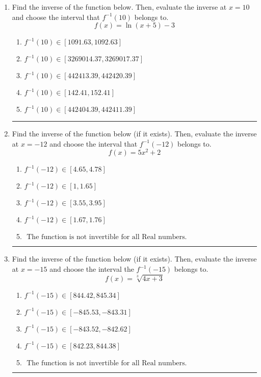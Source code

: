 \documentclass[14pt]{extbook}
\newcommand{\litem}[1]{\item#1\hspace*{-1cm}\rule{\textwidth}{0.4pt}}
\begin{document}
\begin{enumerate}
{\begin{enumerate}[label=\Alph*.]
\end{enumerate} }
\litem{
Find the inverse of the function below. Then, evaluate the inverse at $x = 10$ and choose the interval that $f^{-1}(10)$ belongs to.\[ f(x) = \ln{(x+5)}-3 \]\begin{enumerate}[label=\Alph*.]
\item \( f^{-1}(10) \in [1091.63, 1092.63] \)
\item \( f^{-1}(10) \in [3269014.37, 3269017.37] \)
\item \( f^{-1}(10) \in [442413.39, 442420.39] \)
\item \( f^{-1}(10) \in [142.41, 152.41] \)
\item \( f^{-1}(10) \in [442404.39, 442411.39] \)

\end{enumerate} }
\litem{
Find the inverse of the function below (if it exists). Then, evaluate the inverse at $x = -12$ and choose the interval that $f^{-1}(-12)$ belongs to.\[ f(x) = 5 x^2 + 2 \]\begin{enumerate}[label=\Alph*.]
\item \( f^{-1}(-12) \in [4.65, 4.78] \)
\item \( f^{-1}(-12) \in [1, 1.65] \)
\item \( f^{-1}(-12) \in [3.55, 3.95] \)
\item \( f^{-1}(-12) \in [1.67, 1.76] \)
\item \( \text{ The function is not invertible for all Real numbers. } \)

\end{enumerate} }
\litem{
Find the inverse of the function below (if it exists). Then, evaluate the inverse at $x = -15$ and choose the interval the $f^{-1}(-15)$ belongs to.\[ f(x) = \sqrt[3]{4 x + 3} \]\begin{enumerate}[label=\Alph*.]
\item \( f^{-1}(-15) \in [844.42, 845.34] \)
\item \( f^{-1}(-15) \in [-845.53, -843.31] \)
\item \( f^{-1}(-15) \in [-843.52, -842.62] \)
\item \( f^{-1}(-15) \in [842.23, 844.38] \)
\item \( \text{ The function is not invertible for all Real numbers. } \)


\end{enumerate}}
\end{enumerate}
\end{document}
